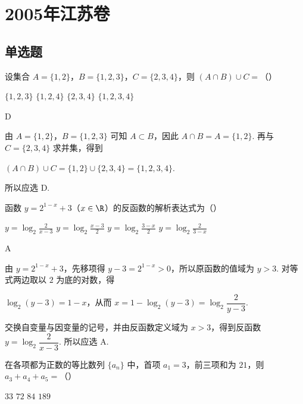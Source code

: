 \chapter{2005年江苏卷}
\section{单选题}
\begin{problem}
设集合 \(A = \{1, 2\}\)，\(B = \{1, 2, 3\}\)，\(C = \{2, 3, 4\}\)，则 \(\left(A \cap B\right) \cup C =\)（\quad）

\choices
    {\(\{1,2,3\}\)}
    {\(\{1,2,4\}\)}
    {\(\{2,3,4\}\)}
    {\(\{1,2,3,4\}\)}
\end{problem}

\begin{answer}
D
\end{answer}

\begin{solution}
由 \(A=\{1,2\}\)，\(B=\{1,2,3\}\) 可知 \(A\subset B\)，因此 \(A\cap B=A=\{1,2\}\). 再与 \(C=\{2,3,4\}\) 求并集，得到

\(\left(A\cap B\right)\cup C=\{1,2\}\cup\{2,3,4\}=\{1,2,3,4\}\).

所以应选 D.
\end{solution}

\begin{problem}
函数 \(y = 2^{1 - x} + 3\)（\(x \in \R\)）的反函数的解析表达式为（\quad）

\choices
    {\(y=\log_{2}\frac{2}{x - 3}\)}
    {\(y=\log_{2}\frac{x - 3}{2}\)}
    {\(y=\log_{2}\frac{3 - x}{2}\)}
    {\(y=\log_{2}\frac{2}{3 - x}\)}
\end{problem}

\begin{answer}
A
\end{answer}

\begin{solution}
由 \(y=2^{1-x}+3\)，先移项得 \(y-3=2^{1-x}>0\)，所以原函数的值域为 \(y>3\). 对等式两边取以 \(2\) 为底的对数，得

\(\log_{2}(y-3)=1-x\)，从而 \(x=1-\log_{2}(y-3)=\log_{2}\dfrac{2}{y-3}\).

交换自变量与因变量的记号，并由反函数定义域为 \(x>3\)，得到反函数 \(y=\log_{2}\dfrac{2}{x-3}\). 所以应选 A.
\end{solution}

\begin{problem}
在各项都为正数的等比数列 \(\{a_{n}\}\) 中，首项 \(a_1 = 3\)，前三项和为 \(21\)，则 \(a_3 + a_4 + a_5 =\)（\quad）

\choices
    {\(33\)}
    {\(72\)}
    {\(84\)}
    {\(189\)}
\end{problem}

